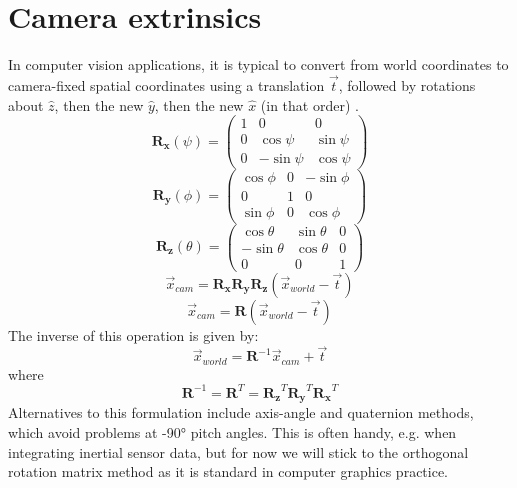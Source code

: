 \section{Camera extrinsics}
In computer vision applications, it is typical to convert from world coordinates to camera-fixed spatial coordinates using a translation $\vec{t}$, followed by rotations about $\hat{z}$, then the new $\hat{y}$, then the new $\hat{x}$ (in that order) \cite{Bradski:2008}. 
\begin{equation}
\mathbf{R_x}(\psi) =
\begin{pmatrix}
1 & 0 & 0 \\ 0 & \cos{\psi} & \sin{\psi} \\ 0 & -\sin{\psi} & \cos{\psi}
\end{pmatrix}
\end{equation}
\begin{equation}
\mathbf{R_y}(\phi) =
\begin{pmatrix}
\cos{\phi} & 0 & -\sin{\phi} \\
0 & 1 & 0 \\
\sin{\phi} & 0 & \cos{\phi}
\end{pmatrix}
\end{equation}
\begin{equation}
\mathbf{R_z}(\theta) = 
\begin{pmatrix}
\cos{\theta} & \sin{\theta} & 0 \\
-\sin{\theta} & \cos{\theta} & 0 \\
0 & 0 & 1
\end{pmatrix}
\end{equation}
\begin{equation}
\vec{x}_{cam} = 
\mathbf{R_x R_y R_z}
(\vec{x}_{world} - \vec{t})
\end{equation}
\begin{equation}
\vec{x}_{cam} = 
\mathbf{R}
(\vec{x}_{world} - \vec{t})
\end{equation}
The inverse of this operation is given by:
\begin{equation}
\vec{x}_{world}
=
\mathbf{R}^{-1} \vec{x}_{cam} + \vec{t} 
\end{equation}
where
\begin{equation}
\mathbf{R}^{-1} =
\mathbf{R}^T =
\mathbf{R_z}^T \mathbf{R_y}^T
\mathbf{R_x}^T
\end{equation}
Alternatives to this formulation include axis-angle and quaternion methods, which avoid problems at \ang{+-90} pitch angles.  This is often handy, e.g. when integrating inertial sensor data, but for now we will stick to the orthogonal rotation matrix method as it is standard in computer graphics practice. 


